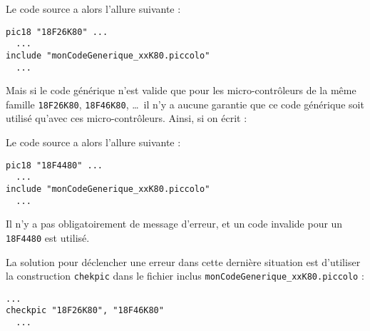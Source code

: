 Le code source a alors l'allure suivante :
\begin{lstlisting}[language=piccolo]
pic18 "18F26K80" ...
  ...
include "monCodeGenerique_xxK80.piccolo"
  ...
\end{lstlisting}

Mais si le code générique n'est valide que pour les micro-contrôleurs de la même famille \texttt{18F26K80}, \texttt{18F46K80}, \dots\ il n'y a aucune garantie que ce code générique soit utilisé qu'avec ces micro-contrôleurs. Ainsi, si on écrit :

Le code source a alors l'allure suivante :
\begin{lstlisting}[language=piccolo]
pic18 "18F4480" ...
  ...
include "monCodeGenerique_xxK80.piccolo"
  ...
\end{lstlisting}

Il n'y a pas obligatoirement de message d'erreur, et un code invalide pour un \texttt{18F4480} est utilisé.


La solution pour déclencher une erreur dans cette dernière situation est d'utiliser la construction \texttt{chekpic} dans le fichier inclus \texttt{monCodeGenerique\_xxK80.piccolo} :

\begin{lstlisting}[language=piccolo]
  ...
checkpic "18F26K80", "18F46K80"
  ...
\end{lstlisting}


 